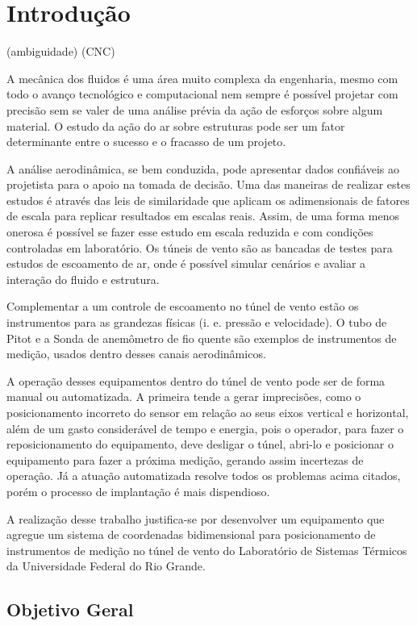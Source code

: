 \chapter{Introdução}\label{ch:introducao}

(\gls{ambiguidade})
(\acrfull{CNC})

A mecânica dos fluidos é uma área muito complexa da engenharia, mesmo com todo o avanço tecnológico e computacional 
nem sempre é possível projetar com precisão sem se valer de uma análise prévia da ação de esforços sobre algum material.
O estudo da ação do ar sobre estruturas pode ser um fator determinante entre o sucesso e o fracasso de um projeto.

A análise aerodinâmica, se bem conduzida, pode apresentar dados confiáveis ao projetista para o apoio na tomada 
de decisão. Uma das maneiras de realizar estes estudos é através das leis de similaridade que aplicam os adimensionais 
de fatores de escala para replicar resultados em escalas reais. Assim, de uma forma menos onerosa é possível se fazer 
esse estudo em escala reduzida e com condições controladas em laboratório. Os túneis de vento são as bancadas de testes 
para estudos de escoamento de ar, onde é possível simular cenários e avaliar a interação do fluido e estrutura.

Complementar a um controle de escoamento no túnel de vento estão os instrumentos para as grandezas físicas 
(i. e. pressão e velocidade). O tubo de Pitot e a Sonda de anemômetro de fio quente são exemplos de instrumentos 
de medição, usados dentro desses canais aerodinâmicos.

A operação desses equipamentos dentro do túnel de vento pode ser de forma manual ou automatizada. A primeira tende a 
gerar imprecisões, como o posicionamento incorreto do sensor em relação ao seus eixos vertical e horizontal, além de 
um gasto considerável de tempo e energia, pois o operador, para fazer o reposicionamento do equipamento, deve desligar 
o túnel, abri-lo e posicionar o equipamento para fazer a próxima medição, gerando assim incertezas de operação. Já a 
atuação automatizada resolve todos os problemas acima citados, porém o processo de implantação é mais dispendioso. 

A realização desse trabalho justifica-se por desenvolver um equipamento que agregue um sistema de coordenadas 
bidimensional para posicionamento de instrumentos de medição no túnel de vento do Laboratório de Sistemas Térmicos  
da Universidade Federal do Rio Grande.

\section{Objetivo Geral}\label{sec:objetivogeral}

